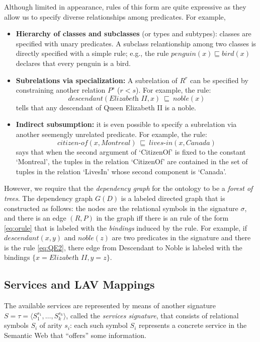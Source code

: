 \documentclass{llncs}
\newcommand{\tup}[1]{\langle #1 \rangle}
\newcommand{\orule}{\sqsubseteq}
\begin{document}
Although limited in appearance, rules of this form are quite expressive
as they allow us to specify diverse relationships among predicates.
For example,
\begin{itemize}
\item \textbf{Hierarchy of classes and subclasses} (or types and subtypes):
classes are specified with unary predicates. A subclass relantionship
among two classes is directly specified with a simple rule; e.g., the
rule $\textit{penguin}(x) \orule \textit{bird}(x)$ declares that every
penguin is a bird.
\item \textbf{Subrelations via specialization:} A subrelation of $R^r$
can be specified by constraining another relation $P^s$ ($r<s$). 
For example, the rule:
\begin{equation}
\label{eq:QE2}
\textit{descendant}(\textit{Elizabeth II},x)\ \orule\ \textit{noble}(x)
\end{equation}
tells that any descendant of Queen Elizabeth II is a noble.
\item \textbf{Indirect subsumption:} it is even possible to specify
a subrelation via another seemengly unrelated predicate. For example,
the rule:
\[ \textit{citizen-of}(x,\textit{Montreal})\ \orule\ \textit{lives-in}(x,\textit{Canada}) \]
says that when the second argument of `CitizenOf' is fixed to the
constant `Montreal', the tuples in the relation `CitizenOf' are
contained in the set of tuples in the relation `LivesIn' whose
second component is `Canada'.
\end{itemize}
However, we require that the \emph{dependency graph} for the ontology
to be a \emph{forest of trees}. The dependency graph $G(D)$ is a
labeled directed graph that is constructed as follows: the nodes
are the relational symbols in the signature $\sigma$, and there
is an edge $(R,P)$ in the graph iff there is an rule of the
form \eqref{eq:orule} that is labeled with the \emph{bindings}
induced by the rule. For example, if $\textit{descendant}(x,y)$
and $\textit{noble}(z)$ are two predicates in the signature
and there is the rule \eqref{eq:QE2}, there edge from 
Descendant to Noble is labeled with the bindings
$\{x=\textit{Elizabeth II},y=z\}$.

\subsection{Services and LAV Mappings}

The available services are represented by means of another signature
$S=\tau=\tup{S_1^{s_1},\ldots,S_k^{s_k}}$, called the \emph{services signature},
that consists of relational symbols $S_i$ of arity $s_i$: each such symbol
$S_i$ represents a concrete service in the Semantic Web that ``offers''
some information.
\end{document}
